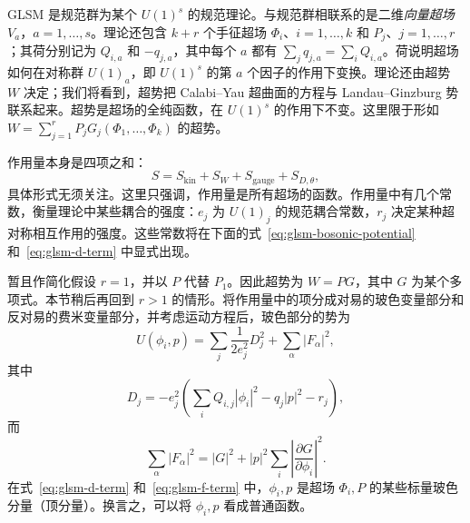 GLSM 是规范群为某个 $U(1)^s$ 的规范理论。与规范群相联系的是二维\emph{向量超场} $V_a$，$a=1,\ldots,s$。理论还包含 $k+r$ 个手征超场 $\Phi_i$、$i=1,\ldots,k$ 和 $P_j$、$j=1,\ldots,r$；其荷分别记为 $Q_{i,a}$ 和 $-q_{j,a}$，其中每个 $a$ 都有 $\sum_jq_{j,a}=\sum_iQ_{i,a}$。荷说明超场如何在对称群 $U(1)_a$，即 $U(1)^s$ 的第 $a$ 个因子的作用下变换。理论还由超势 $W$ 决定；我们将看到，超势把 Calabi--Yau 超曲面的方程与 Landau--Ginzburg 势联系起来。超势是超场的全纯函数，在 $U(1)^s$ 的作用下不变。这里限于形如 $W=\sum_{j=1}^rP_jG_j(\Phi_1,\ldots,\Phi_k)$ 的超势。

作用量本身是四项之和：
\begin{equation}\label{eq:glsm-action-decomposition}
S=S_{\mathrm{kin}}+S_W+S_{\mathrm{gauge}}+S_{D,\theta},
\end{equation}
具体形式无须关注。这里只强调，作用量是所有超场的函数。作用量中有几个常数，衡量理论中某些耦合的强度：$e_j$ 为 $U(1)_j$ 的规范耦合常数，$r_j$ 决定某种超对称相互作用的强度。这些常数将在下面的式~\eqref{eq:glsm-bosonic-potential} 和~\eqref{eq:glsm-d-term} 中显式出现。

暂且作简化假设 $r=1$，并以 $P$ 代替 $P_1$。因此超势为 $W=PG$，其中 $G$ 为某个多项式。本节稍后再回到 $r>1$ 的情形。将作用量中的项分成对易的玻色变量部分和反对易的费米变量部分，并考虑运动方程后，玻色部分的势为
\begin{equation}\label{eq:glsm-bosonic-potential}
U(\phi_i,p)=\sum_j\frac1{2e_j^2}D_j^2+\sum_\alpha|F_\alpha|^2,
\end{equation}
其中
\begin{equation}\label{eq:glsm-d-term}
D_j=-e_j^2\left(\sum_iQ_{i,j}|\phi_i|^2-q_j|p|^2-r_j\right),
\end{equation}
而
\begin{equation}\label{eq:glsm-f-term}
\sum_\alpha|F_\alpha|^2=|G|^2+|p|^2\sum_i\left|\frac{\partial G}{\partial\phi_i}\right|^2.
\end{equation}
在式~\eqref{eq:glsm-d-term} 和~\eqref{eq:glsm-f-term} 中，$\phi_i,p$ 是超场 $\Phi_i,P$ 的某些标量玻色分量（顶分量）。换言之，可以将 $\phi_i,p$ 看成普通函数。

